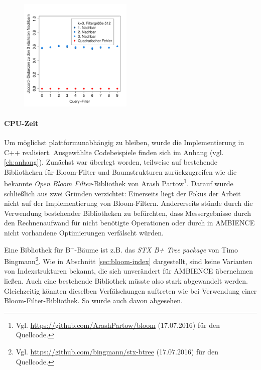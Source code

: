 \begin{figure}[hpbt]
	\hspace{0.01\textwidth}
	\includegraphics[width=0.48\textwidth]{pictures/nn3_512-2.pdf}\\
\end{figure}
\paragraph*{CPU-Zeit}
Um möglichst plattformunabhängig zu bleiben, wurde die Implementierung in C++ realisiert. Ausgewählte Codebeispiele finden sich im Anhang (vgl. \ref{ch:anhang}). Zunächst war überlegt worden, teilweise auf bestehende Bibliotheken für Bloom-Filter und Baumstrukturen zurückzugreifen wie die bekannte \textit{Open Bloom Filter}-Bibliothek von Arash Partow\footnote{Vgl. \url{https://github.com/ArashPartow/bloom} (17.07.2016) für den Quellcode.}. Darauf wurde schließlich aus zwei Gründen verzichtet: Einerseits liegt der Fokus der Arbeit nicht auf der Implementierung von Bloom-Filtern. Andererseits stünde durch die Verwendung bestehender Bibliotheken zu befürchten, dass Messergebnisse durch den Rechnenaufwand für nicht benötigte Operationen oder durch in AMBIENCE nicht vorhandene Optimierungen verfälscht würden. 

Eine Bibliothek für B$^+$-Bäume ist z.B. das \textit{STX B+ Tree package} von Timo Bingmann\footnote{Vgl. \url{https://github.com/bingmann/stx-btree} (17.07.2016) für den Quellcode.}. Wie in Abschnitt \ref{sec:bloom-index} dargestellt, sind keine Varianten von Indexstrukturen bekannt, die sich unverändert für AMBIENCE übernehmen ließen. Auch eine bestehende Bibliothek müsste also stark abgewandelt werden. Gleichzeitig könnten dieselben Verfälschungen auftreten wie bei Verwendung einer Bloom-Filter-Bibliothek. So wurde auch davon abgesehen.

